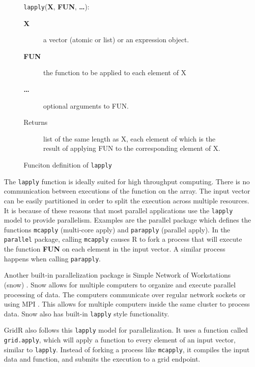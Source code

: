 \documentclass[conference]{IEEEtran}
\begin{document}
\begin{figure}[ht!]
\begin{framed}
\texttt{lapply}(\textbf{X}, \textbf{FUN}, \textbf{\ldots}):
\begin{description}
\item[\textbf{X}] a vector (atomic or list) or an expression object.
\item[\textbf{FUN}] the function to be applied to each element of X
\item[\textbf{\ldots}] optional arguments to FUN.
\item[Returns] list of the same length as X, each element of which is the result of applying FUN to the corresponding element of X.
\end{description}
\end{framed}

\centering
\captionsetup{justification=centering}
\caption{Funciton definition of \texttt{lapply}}
\label{lst:lapply}
\end{figure}

The \texttt{lapply} function is ideally suited for high throughput computing.  There is no communication between executions of the function on the array.  The input vector can be easily partitioned in order to split the execution across multiple resources.  It is because of these reasons that most parallel applications use the \texttt{lapply} model to provide parallelism.  Examples are the parallel package which defines the functions \texttt{mcapply} (multi-core apply) and \texttt{parapply} (parallel apply). In the \texttt{parallel} package, calling \texttt{mcapply} causes R to fork a process that will execute the function \textbf{FUN} on each element in the input vector.  A similar process happens when calling \texttt{parapply}. 

Another built-in parallelization package is Simple Network of Workstations (snow) \cite{rlangsnow}.  Snow allows for multiple computers to organize and execute parallel processing of data.  The computers communicate over regular network sockets or using MPI \cite{gropp1999using}.  This allows for multiple computers inside the same cluster to process data.  Snow also has built-in \texttt{lapply} style functionality.

GridR also follows this \texttt{lapply} model for parallelization.  It uses a function called \texttt{grid.apply}, which will apply a function to every element of an input vector, similar to \texttt{lapply}.  Instead of forking a process like \texttt{mcapply}, it compiles the input data and function, and submits the execution to a grid endpoint.
\end{document}
